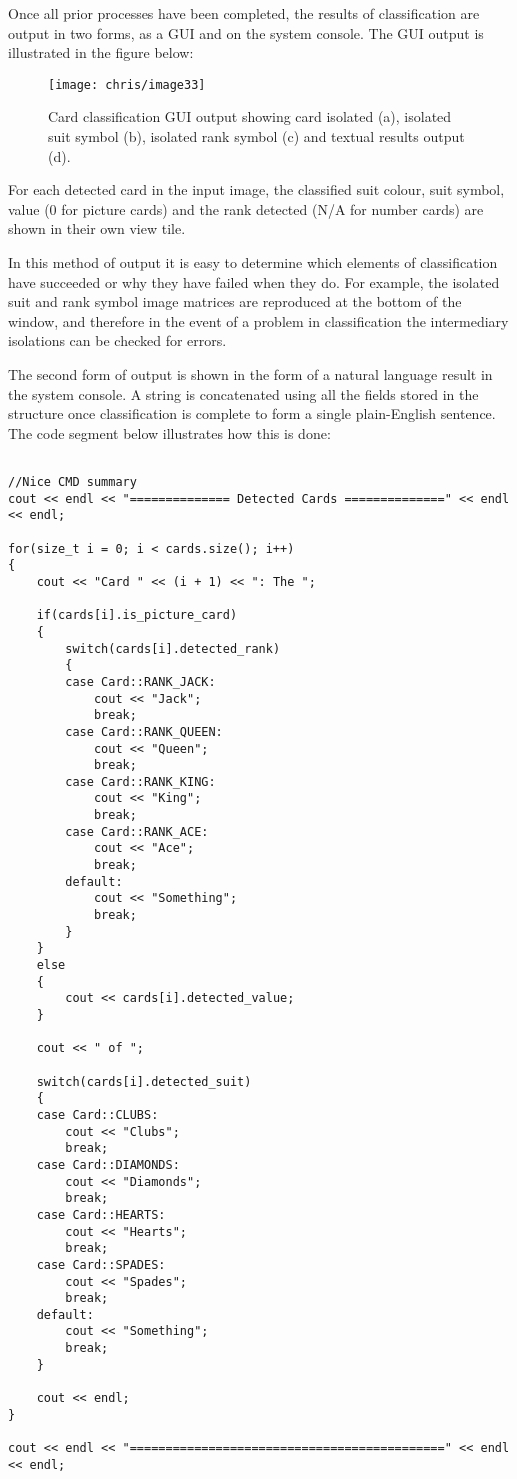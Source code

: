 		Once all prior processes have been completed, the results of classification are output in two forms, as a GUI and on the system console. The GUI output is illustrated in the figure below:
		
		\begin{figure}[H]
			\centering
			\texttt{[image: chris/image33]}
			\caption{Card classification GUI output showing card isolated (a), isolated suit symbol (b), isolated rank symbol (c) and textual results output (d).}
		\end{figure}

		For each detected card in the input image, the classified suit colour, suit symbol, value (0 for picture cards) and the rank detected (N/A for number cards) are shown in their own view tile.
		
		In this method of output it is easy to determine which elements of classification have succeeded or why they have failed when they do. For example, the isolated suit and rank symbol image matrices are reproduced at the bottom of the window, and therefore in the event of a problem in classification the intermediary isolations can be checked for errors. 
		
		The second form of output is shown in the form of a natural language result in the system console. A string is concatenated using all the fields stored in the  structure once classification is complete to form a single plain-English sentence. The code segment below illustrates how this is done:

		\begin{lstlisting}

//Nice CMD summary
cout << endl << "============== Detected Cards ==============" << endl << endl;

for(size_t i = 0; i < cards.size(); i++)
{
    cout << "Card " << (i + 1) << ": The ";

    if(cards[i].is_picture_card)
    {
        switch(cards[i].detected_rank)
        {
        case Card::RANK_JACK:
            cout << "Jack";
            break;
        case Card::RANK_QUEEN:
            cout << "Queen";
            break;
        case Card::RANK_KING:
            cout << "King";
            break;
        case Card::RANK_ACE:
            cout << "Ace";
            break;
        default:
            cout << "Something";
            break;
        }
    }
    else
    {
        cout << cards[i].detected_value;
    }

    cout << " of ";

    switch(cards[i].detected_suit)
    {
    case Card::CLUBS:
        cout << "Clubs";
        break;
    case Card::DIAMONDS:
        cout << "Diamonds";
        break;
    case Card::HEARTS:
        cout << "Hearts";
        break;
    case Card::SPADES:
        cout << "Spades";
        break;
    default:
        cout << "Something";
        break;
    }

    cout << endl;
}

cout << endl << "============================================" << endl << endl;
		\end{lstlisting}

